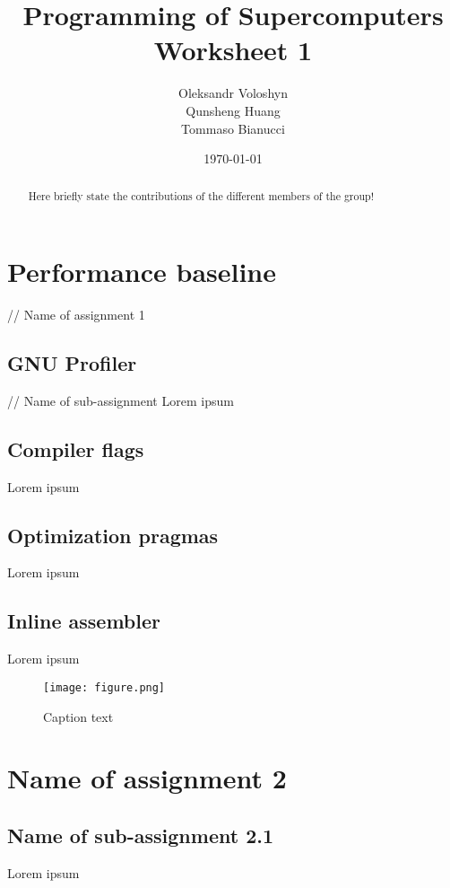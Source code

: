 \documentclass{article}
\title{Programming of Supercomputers\\Worksheet 1}
\author{Oleksandr Voloshyn\\ Qunsheng Huang\\ Tommaso Bianucci}
\date{\today}
\begin{document}
\maketitle
\renewcommand{\abstractname}{Group members's contributions}
\begin{abstract}
	Here briefly state the contributions of the different members of the group!
\end{abstract}

\section{Performance baseline} // Name of assignment 1
\subsection{GNU Profiler} // Name of sub-assignment
Lorem ipsum

\subsection{Compiler flags}
Lorem ipsum

\subsection{Optimization pragmas}
Lorem ipsum

\subsection{Inline assembler}
Lorem ipsum

\begin{figure}[h!] %
 	\begin{center}
 		\texttt{[image: figure.png]} %
 		\caption{Caption text}
 		\label{fig:figureLabelName}
 	\end{center}
\end{figure}

\section{Name of assignment 2}
\subsection{Name of sub-assignment 2.1}
Lorem ipsum
\end{document}
